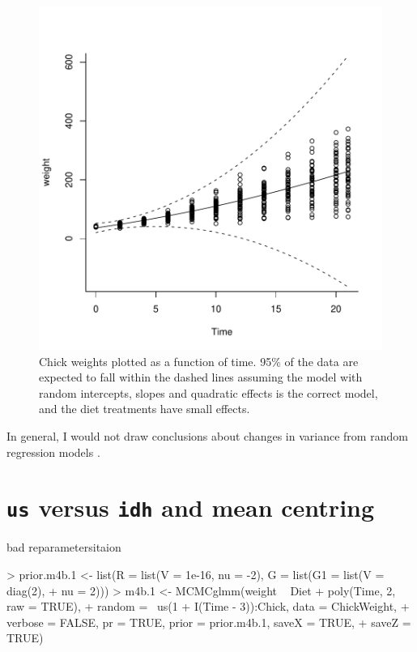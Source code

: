 \documentclass{article}
\begin{document}
\begin{figure}[!h]
\begin{center}
\includegraphics{Lecture4-040}
\end{center}
\caption{Chick weights plotted as a function of time. 95\% of the data are expected to fall within the dashed lines assuming the model with random intercepts, slopes and quadratic effects is the correct model, and the diet treatments have small effects.}
\label{VCVpred.3-fig}
\end{figure}

In general, I would not draw conclusions about changes in variance from random regression models \citep{Pletcher.1999a}.

\section{\texttt{us} versus \texttt{idh} and mean centring}
\label{RRcentering}
bad 
reparametersitaion

\begin{Schunk}
\begin{Sinput}
> prior.m4b.1 <- list(R = list(V = 1e-16, nu = -2), G = list(G1 = list(V = diag(2), 
+     nu = 2)))
> m4b.1 <- MCMCglmm(weight ~ Diet + poly(Time, 2, raw = TRUE), 
+     random = ~us(1 + I(Time - 3)):Chick, data = ChickWeight, 
+     verbose = FALSE, pr = TRUE, prior = prior.m4b.1, saveX = TRUE, 
+     saveZ = TRUE)
\end{Sinput}
\end{Schunk}
\end{document}
